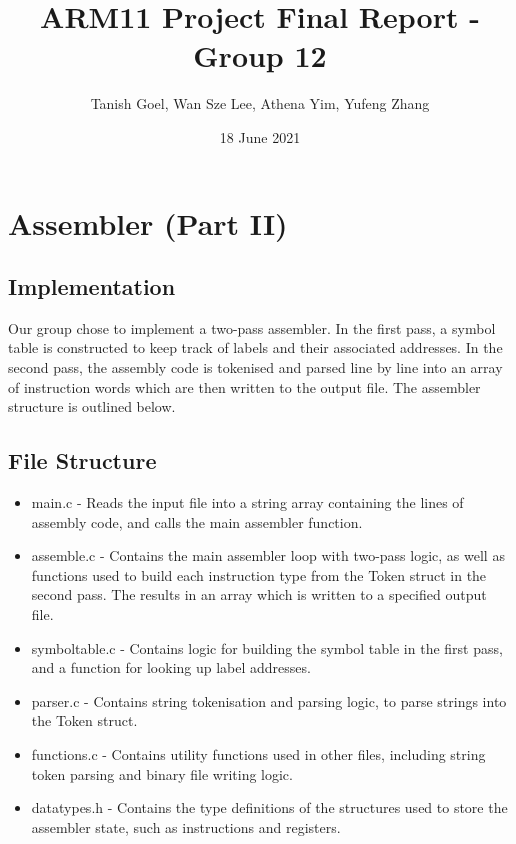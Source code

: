 \documentclass[a4paper,11pt]{article}
\begin{document}
\title{\vspace{-1.0cm}ARM11 Project Final Report - Group 12}
\author{Tanish Goel, Wan Sze Lee, Athena Yim, Yufeng Zhang}
\date{18 June 2021}
\maketitle

\section{Assembler (Part II)}
\subsection{Implementation}
Our group chose to implement a two-pass assembler. In the first pass, a symbol table is constructed to keep track of labels and their associated addresses. In the second pass, the assembly code is tokenised and parsed line by line into an array of instruction words which are then written to the output file. The assembler structure is outlined below.

\subsection{File Structure}
\begin{itemize}
\item main.c - Reads the input file into a string array containing the lines of assembly code, and calls the main assembler function.
\item assemble.c - Contains the main assembler loop with two-pass logic, as well as functions used to build each instruction type from the Token struct in the second pass. The results in an array which is written to a specified output file.
\item symboltable.c - Contains logic for building the symbol table in the first pass, and a function for looking up label addresses.
\item parser.c - Contains string tokenisation and parsing logic, to parse strings into the Token struct.
\item functions.c - Contains utility functions used in other files, including string token parsing and binary file writing logic.
\item datatypes.h - Contains the type definitions of the structures used to store the assembler state, such as instructions and registers.
\end{itemize}
\end{document}
